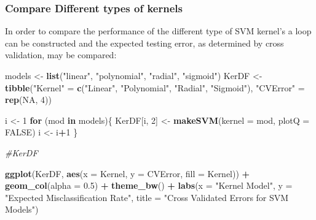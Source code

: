 \documentclass[12pt]{article}
\newenvironment{Shaded}{\begin{snugshade}}{\end{snugshade}}
\newcommand{\CommentTok}[1]{\textcolor[rgb]{0.56,0.35,0.01}{\textit{#1}}}
\newcommand{\ControlFlowTok}[1]{\textcolor[rgb]{0.13,0.29,0.53}{\textbf{#1}}}
\newcommand{\DataTypeTok}[1]{\textcolor[rgb]{0.13,0.29,0.53}{#1}}
\newcommand{\DecValTok}[1]{\textcolor[rgb]{0.00,0.00,0.81}{#1}}
\newcommand{\FloatTok}[1]{\textcolor[rgb]{0.00,0.00,0.81}{#1}}
\newcommand{\KeywordTok}[1]{\textcolor[rgb]{0.13,0.29,0.53}{\textbf{#1}}}
\newcommand{\NormalTok}[1]{#1}
\newcommand{\OperatorTok}[1]{\textcolor[rgb]{0.81,0.36,0.00}{\textbf{#1}}}
\newcommand{\OtherTok}[1]{\textcolor[rgb]{0.56,0.35,0.01}{#1}}
\newcommand{\StringTok}[1]{\textcolor[rgb]{0.31,0.60,0.02}{#1}}
\begin{document}
\hypertarget{compare-different-types-of-kernels}{%
\subsubsection{Compare Different types of
kernels}\label{compare-different-types-of-kernels}}

In order to compare the performance of the different type of SVM
kernel's a loop can be constructed and the expected testing error, as
determined by cross validation, may be compared:

\begin{Shaded}
\begin{Highlighting}[]
\NormalTok{models <-}\StringTok{ }\KeywordTok{list}\NormalTok{(}\StringTok{"linear"}\NormalTok{, }\StringTok{"polynomial"}\NormalTok{, }\StringTok{"radial"}\NormalTok{, }\StringTok{"sigmoid"}\NormalTok{)}
\NormalTok{KerDF <-}\StringTok{ }\KeywordTok{tibble}\NormalTok{(}\StringTok{"Kernel"}\NormalTok{ =}\StringTok{ }\KeywordTok{c}\NormalTok{(}\StringTok{"Linear"}\NormalTok{, }\StringTok{"Polynomial"}\NormalTok{, }\StringTok{"Radial"}\NormalTok{, }\StringTok{"Sigmoid"}\NormalTok{), }\StringTok{"CVError"}\NormalTok{ =}\StringTok{ }\KeywordTok{rep}\NormalTok{(}\OtherTok{NA}\NormalTok{, }\DecValTok{4}\NormalTok{))}


\NormalTok{i <-}\StringTok{ }\DecValTok{1}
\ControlFlowTok{for}\NormalTok{ (mod }\ControlFlowTok{in}\NormalTok{ models)\{}
\NormalTok{KerDF[i, }\DecValTok{2}\NormalTok{] <-}\StringTok{ }\KeywordTok{makeSVM}\NormalTok{(}\DataTypeTok{kernel =}\NormalTok{ mod, }\DataTypeTok{plotQ =} \OtherTok{FALSE}\NormalTok{)}
\NormalTok{i <-}\StringTok{ }\NormalTok{i}\OperatorTok{+}\DecValTok{1} 
\NormalTok{\}}

\CommentTok{#KerDF}

\KeywordTok{ggplot}\NormalTok{(KerDF, }\KeywordTok{aes}\NormalTok{(}\DataTypeTok{x =}\NormalTok{ Kernel, }\DataTypeTok{y =}\NormalTok{ CVError, }\DataTypeTok{fill =}\NormalTok{ Kernel)) }\OperatorTok{+}
\StringTok{  }\KeywordTok{geom_col}\NormalTok{(}\DataTypeTok{alpha =} \FloatTok{0.5}\NormalTok{) }\OperatorTok{+}\StringTok{ }
\StringTok{  }\KeywordTok{theme_bw}\NormalTok{() }\OperatorTok{+}
\StringTok{  }\KeywordTok{labs}\NormalTok{(}\DataTypeTok{x =} \StringTok{"Kernel Model"}\NormalTok{, }\DataTypeTok{y =} \StringTok{"Expected Misclassification Rate"}\NormalTok{, }\DataTypeTok{title =} \StringTok{"Cross Validated Errors for SVM Models"}\NormalTok{)}
\end{Highlighting}
\end{Shaded}
\end{document}
